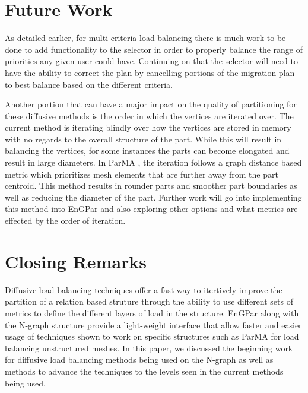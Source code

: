 \documentclass[a4paper]{article}
\begin{document}
\section{Future Work}
As detailed earlier, for multi-criteria load balancing there is much work to be done to add functionality to the selector in order to properly balance the range of priorities any given user could have. Continuing on that the selector will need to have the ability to correct the plan by cancelling portions of the migration plan to best balance based on the different criteria.

Another portion that can have a major impact on the quality of partitioning for these diffusive methods is the order in which the vertices are iterated over. The current method is iterating blindly over how the vertices are stored in memory with no regards to the overall structure of the part. While this will result in balancing the vertices, for some instances the parts can become elongated and result in large diameters. In ParMA \cite{SmithParma2015}, the iteration follows a graph distance based metric which prioritizes mesh elements that are further away from the part centroid. This method results in rounder parts and smoother part boundaries as well as reducing the diameter of the part. Further work will go into implementing this method into EnGPar and also exploring other options and what metrics are effected by the order of iteration.

\section{Closing Remarks}
Diffusive load balancing techniques offer a fast way to itertively improve the partition of a relation based struture through the ability to use different sets of metrics to define the different layers of load in the structure. EnGPar along with the N-graph structure provide a light-weight interface that allow faster and easier usage of techniques shown to work on specific structures such as ParMA for load balancing unstructured meshes. In this paper, we discussed the beginning work for diffusive load balancing methods being used on the N-graph as well as methods to advance the techniques to the levels seen in the current methods being used.


\newpage 

\end{document}
